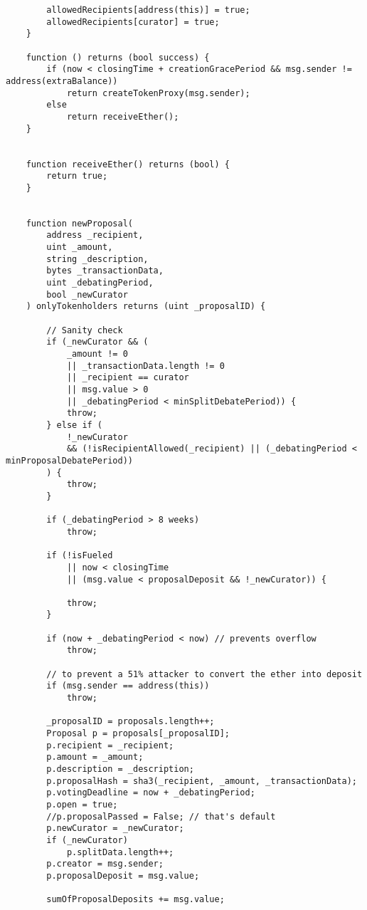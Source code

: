 \documentclass[9pt,oneside]{amsart}
\begin{document}
\begin{appendix}
\begin{verbatim}
        allowedRecipients[address(this)] = true;
        allowedRecipients[curator] = true;
    }

    function () returns (bool success) {
        if (now < closingTime + creationGracePeriod && msg.sender != address(extraBalance))
            return createTokenProxy(msg.sender);
        else
            return receiveEther();
    }


    function receiveEther() returns (bool) {
        return true;
    }


    function newProposal(
        address _recipient,
        uint _amount,
        string _description,
        bytes _transactionData,
        uint _debatingPeriod,
        bool _newCurator
    ) onlyTokenholders returns (uint _proposalID) {

        // Sanity check
        if (_newCurator && (
            _amount != 0
            || _transactionData.length != 0
            || _recipient == curator
            || msg.value > 0
            || _debatingPeriod < minSplitDebatePeriod)) {
            throw;
        } else if (
            !_newCurator
            && (!isRecipientAllowed(_recipient) || (_debatingPeriod <  minProposalDebatePeriod))
        ) {
            throw;
        }

        if (_debatingPeriod > 8 weeks)
            throw;

        if (!isFueled
            || now < closingTime
            || (msg.value < proposalDeposit && !_newCurator)) {

            throw;
        }

        if (now + _debatingPeriod < now) // prevents overflow
            throw;

        // to prevent a 51% attacker to convert the ether into deposit
        if (msg.sender == address(this))
            throw;

        _proposalID = proposals.length++;
        Proposal p = proposals[_proposalID];
        p.recipient = _recipient;
        p.amount = _amount;
        p.description = _description;
        p.proposalHash = sha3(_recipient, _amount, _transactionData);
        p.votingDeadline = now + _debatingPeriod;
        p.open = true;
        //p.proposalPassed = False; // that's default
        p.newCurator = _newCurator;
        if (_newCurator)
            p.splitData.length++;
        p.creator = msg.sender;
        p.proposalDeposit = msg.value;

        sumOfProposalDeposits += msg.value;


\end{verbatim}
\end{appendix}
\end{document}

